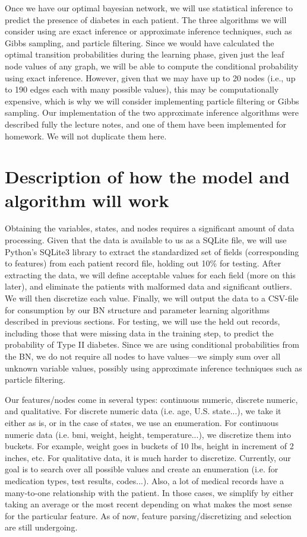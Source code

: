 \documentclass[11pt]{article}
\begin{document}
Once we have our optimal bayesian network, we will use statistical inference to predict the presence of diabetes in each patient. The three algorithms we will consider using are exact inference or approximate inference techniques, such as Gibbs sampling, and particle filtering. Since we would have calculated the optimal transition probabilities during the learning phase, given just the leaf node values of any graph, we will be able to compute the conditional probability using exact inference. However, given that we may have up to 20 nodes (i.e., up to 190 edges each with many possible values), this may be computationally expensive, which is why we will consider implementing particle filtering or Gibbs sampling. Our implementation of the two approximate inference algorithms were described fully the lecture notes, and one of them have been implemented for homework. We will not duplicate them here. 

\section{Description of how the model and algorithm will work}

Obtaining the variables, states, and nodes requires a significant amount of data processing. Given that the data is available to us as a SQLite file, we will use Python's SQLite3 library to extract the standardized set of fields (corresponding to features) from each patient record file, holding out 10\% for testing. After extracting the data, we will define acceptable values for each field (more on this later), and eliminate the patients with malformed data and significant outliers. We will then discretize each value. Finally, we will output the data to a CSV-file for consumption by our BN structure and parameter learning algorithms described in previous sections. For testing, we will use the held out records, including those that were missing data in the training step, to predict the probability of Type II diabetes. Since we are using conditional probabilities from the BN, we do not require all nodes to have values---we simply sum over all unknown variable values, possibly using approximate inference techniques such as particle filtering. 

Our features/nodes come in several types: continuous numeric, discrete numeric, and qualitative. For discrete numeric data (i.e. age, U.S. state...), we take it either as is, or in the case of states, we use an enumeration. For continuous numeric data (i.e. bmi, weight, height, temperature...), we discretize them into buckets. For example, weight goes in buckets of 10 lbs, height in increment of 2 inches, etc. For qualitative data, it is much harder to discretize. Currently, our goal is to search over all possible values and create an enumeration (i.e. for medication types, test results, codes...). Also, a lot of medical records have a many-to-one relationship with the patient. In those cases, we simplify by either taking an average or the most recent depending on what makes the most sense for the particular feature. As of now, feature parsing/discretizing and selection are still undergoing. 


\end{document}
